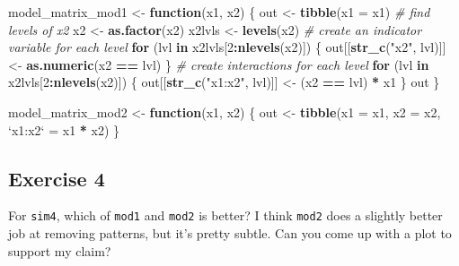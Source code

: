 \documentclass[]{book}
\newenvironment{Shaded}{\begin{snugshade}}{\end{snugshade}}
\newcommand{\CommentTok}[1]{\textcolor[rgb]{0.56,0.35,0.01}{\textit{#1}}}
\newcommand{\ControlFlowTok}[1]{\textcolor[rgb]{0.13,0.29,0.53}{\textbf{#1}}}
\newcommand{\DataTypeTok}[1]{\textcolor[rgb]{0.13,0.29,0.53}{#1}}
\newcommand{\DecValTok}[1]{\textcolor[rgb]{0.00,0.00,0.81}{#1}}
\newcommand{\KeywordTok}[1]{\textcolor[rgb]{0.13,0.29,0.53}{\textbf{#1}}}
\newcommand{\NormalTok}[1]{#1}
\newcommand{\OperatorTok}[1]{\textcolor[rgb]{0.81,0.36,0.00}{\textbf{#1}}}
\newcommand{\StringTok}[1]{\textcolor[rgb]{0.31,0.60,0.02}{#1}}
\theoremstyle{plain}
\theoremstyle{remark}
\theoremstyle{definition}
\theoremstyle{definition}
\theoremstyle{definition}
\theoremstyle{remark}
\begin{document}
\begin{Shaded}
\begin{Highlighting}[]
\NormalTok{model_matrix_mod1 <-}\StringTok{ }\ControlFlowTok{function}\NormalTok{(x1, x2) \{}
\NormalTok{  out <-}\StringTok{ }\KeywordTok{tibble}\NormalTok{(}\DataTypeTok{x1 =}\NormalTok{ x1)  }
  \CommentTok{# find levels of x2}
\NormalTok{  x2 <-}\StringTok{ }\KeywordTok{as.factor}\NormalTok{(x2)}
\NormalTok{  x2lvls <-}\StringTok{ }\KeywordTok{levels}\NormalTok{(x2)}
  \CommentTok{# create an indicator variable for each level}
  \ControlFlowTok{for}\NormalTok{ (lvl }\ControlFlowTok{in}\NormalTok{ x2lvls[}\DecValTok{2}\OperatorTok{:}\KeywordTok{nlevels}\NormalTok{(x2)]) \{}
\NormalTok{    out[[}\KeywordTok{str_c}\NormalTok{(}\StringTok{"x2"}\NormalTok{, lvl)]] <-}\StringTok{ }\KeywordTok{as.numeric}\NormalTok{(x2 }\OperatorTok{==}\StringTok{ }\NormalTok{lvl)}
\NormalTok{  \}}
  \CommentTok{# create interactions for each level}
  \ControlFlowTok{for}\NormalTok{ (lvl }\ControlFlowTok{in}\NormalTok{ x2lvls[}\DecValTok{2}\OperatorTok{:}\KeywordTok{nlevels}\NormalTok{(x2)]) \{}
\NormalTok{    out[[}\KeywordTok{str_c}\NormalTok{(}\StringTok{"x1:x2"}\NormalTok{, lvl)]] <-}\StringTok{ }\NormalTok{(x2 }\OperatorTok{==}\StringTok{ }\NormalTok{lvl) }\OperatorTok{*}\StringTok{ }\NormalTok{x1}
\NormalTok{  \}}
\NormalTok{  out}
\NormalTok{\}}
\end{Highlighting}
\end{Shaded}

\begin{Shaded}
\begin{Highlighting}[]
\NormalTok{model_matrix_mod2 <-}\StringTok{ }\ControlFlowTok{function}\NormalTok{(x1, x2) \{}
\NormalTok{  out <-}\StringTok{ }\KeywordTok{tibble}\NormalTok{(}\DataTypeTok{x1 =}\NormalTok{ x1,}
                \DataTypeTok{x2 =}\NormalTok{ x2,}
                \StringTok{`}\DataTypeTok{x1:x2}\StringTok{`}\NormalTok{ =}\StringTok{ }\NormalTok{x1 }\OperatorTok{*}\StringTok{ }\NormalTok{x2)}
\NormalTok{\}}
\end{Highlighting}
\end{Shaded}

\hypertarget{exercise-4-36}{%
\subsection{Exercise 4}\label{exercise-4-36}}

For \texttt{sim4}, which of \texttt{mod1} and \texttt{mod2} is better? I
think \texttt{mod2} does a slightly better job at removing patterns, but
it's pretty subtle. Can you come up with a plot to support my claim?
\end{document}
